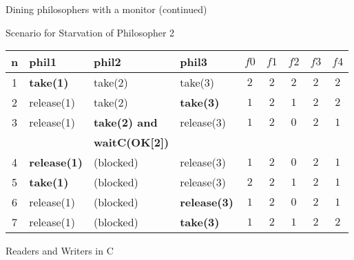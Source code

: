 \addtocounter{algcounter}{-1}

\begin{wideslide}[bm=,toc=]{\large }
\begin{alg}{Dining philosophers with a monitor (continued)}{}
\\\hline
{}
\end{alg}
\end{wideslide}

\begin{wideslide}[bm=,toc=]{\large Scenario for Starvation of Philosopher 2}
\begin{center}
\begin{paenv}
\begin{tabular}{|c|l|l|l|c|c|c|c|c|}
\hline
n& phil1 & phil2 & phil3 & $f0$ & $f1$ & $f2$ & $f3$ & $f4$\\ \hline
1&\bfseries take(1) & take(2) & take(3) & $2$ & $2$ & $2$ & $2$ & $2$\\\hline
2&release(1) & take(2) & \bfseries take(3) & $1$ & $2$ & $1$ & $2$ & $2$\\\hline
3& release(1) & \bfseries take(2) and & release(3) & $1$ & $2$ & $0$ & $2$ & $1$\\
& & \bfseries waitC(OK[2]) & & & & & & \\\hline
4& \bfseries release(1) & (blocked) & release(3) & $1$ & $2$ & $0$ & $2$ & $1$\\\hline
5& \bfseries take(1) & (blocked) & release(3) & $2$ & $2$ & $1$ & $2$ & $1$\\\hline
6& release(1) & (blocked) & \bfseries release(3) & $1$ & $2$ & $0$ & $2$ & $1$\\\hline
7& release(1) & (blocked) & \bfseries take(3) & $1$ & $2$ & $1$ & $2$ & $2$\\\hline
\end{tabular}
\end{paenv}
\end{center}
\end{wideslide}

\begin{wideslide}[bm=,toc=]{\large Readers and Writers in C}
\vspace*{-2ex}
\end{wideslide}

